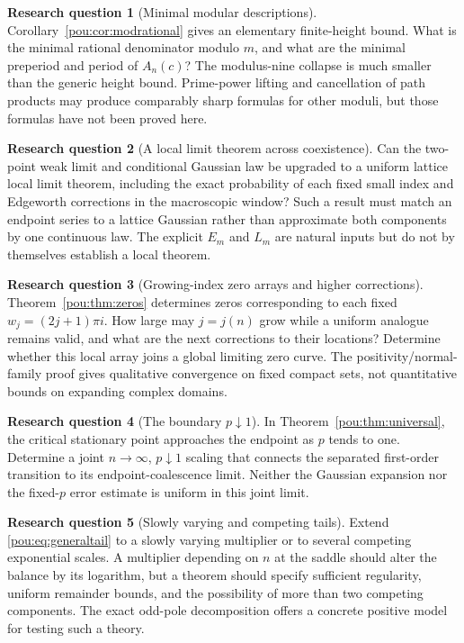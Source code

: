 \documentclass[11pt]{article}
\theoremstyle{definition}
\newtheorem{question}{Research question}
\theoremstyle{remark}
\begin{document}
\begin{question}[Minimal modular descriptions]
Corollary~\ref{pou:cor:modrational} gives an elementary finite-height bound.
What is the minimal rational denominator modulo $m$, and what are the
minimal preperiod and period of $A_n(c)$?  The modulus-nine collapse is
much smaller than the generic height bound.  Prime-power lifting and
cancellation of path products may produce comparably sharp formulas for
other moduli, but those formulas have not been proved here.
\end{question}

\begin{question}[A local limit theorem across coexistence]
Can the two-point weak limit and conditional Gaussian law be upgraded to
a uniform lattice local limit theorem, including the exact probability
of each fixed small index and Edgeworth corrections in the macroscopic
window?  Such a result must match an endpoint series to a lattice
Gaussian rather than approximate both components by one continuous law.
The explicit $E_m$ and $L_m$ are natural inputs but do not by themselves
establish a local theorem.
\end{question}

\begin{question}[Growing-index zero arrays and higher corrections]
Theorem~\ref{pou:thm:zeros} determines zeros corresponding to each fixed
$w_j=(2j+1)\pi i$.  How large may $j=j(n)$ grow while a uniform analogue
remains valid, and what are the next corrections to their locations?
Determine whether this local array joins a global limiting zero curve.
The positivity/normal-family proof gives qualitative convergence on
fixed compact sets, not quantitative bounds on expanding complex domains.
\end{question}

\begin{question}[The boundary $p\downarrow1$]
In Theorem~\ref{pou:thm:universal}, the critical stationary point approaches
the endpoint as $p$ tends to one.  Determine a joint $n\to\infty$,
$p\downarrow1$ scaling that connects the separated first-order transition
to its endpoint-coalescence limit.  Neither the Gaussian expansion nor
the fixed-$p$ error estimate is uniform in this joint limit.
\end{question}

\begin{question}[Slowly varying and competing tails]
Extend \eqref{pou:eq:generaltail} to a slowly varying multiplier or to several
competing exponential scales.  A multiplier depending on $n$ at the
saddle should alter the balance by its logarithm, but a theorem should
specify sufficient regularity, uniform remainder bounds, and the
possibility of more than two competing components.  The exact odd-pole
decomposition offers a concrete positive model for testing such a theory.
\end{question}
\end{document}
